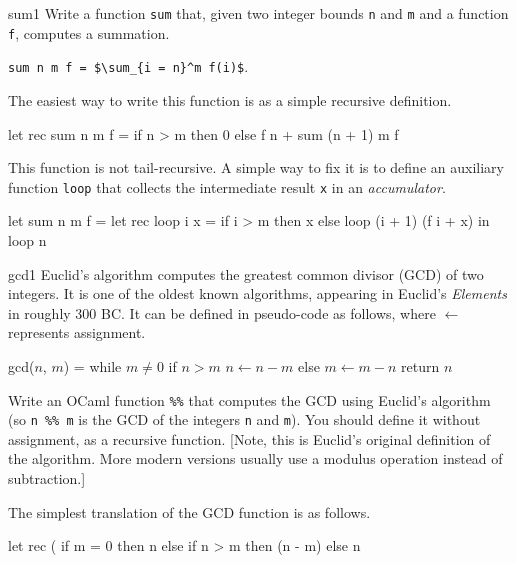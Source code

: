 %
\begin{exercise}{sum1}
Write a function \hbox{\lstinline/sum/} that, given two integer bounds \hbox{\lstinline/n/} and \hbox{\lstinline/m/} and
a function \hbox{\lstinline/f/}, computes a summation.

\begin{center}
\lstinline!sum n m f = $\sum_{i = n}^m f(i)$!.
\end{center}
%
\begin{answer}\ifanswers
The easiest way to write this function is as a simple recursive definition.

\begin{ocaml}
let rec sum n m f =
   if n > m then
      0
   else
      f n + sum (n + 1) m f
\end{ocaml}
%
This function is not tail-recursive.  A simple way to fix it is to define an auxiliary function
\hbox{\lstinline/loop/} that collects the intermediate result \hbox{\lstinline/x/} in an
\emph{accumulator}.

\begin{ocaml}
let sum n m f =
   let rec loop i x =
      if i > m then
         x
      else
         loop (i + 1) (f i + x)
   in
      loop n
\end{ocaml}
\fi\end{answer}
\end{exercise}

%
\begin{exercise}{gcd1}
Euclid's algorithm computes the greatest common divisor (GCD) of two integers.  It is one of the
oldest known algorithms, appearing in Euclid's \emph{Elements} in roughly 300 BC.  It can be defined in
pseudo-code as follows, where $\leftarrow$ represents assignment.

\begin{ocaml}
gcd($n$, $m$) =
   while $m \neq 0$
      if $n > m$
         $n \leftarrow n - m$
      else
         $m \leftarrow m - n$
   return $n$
\end{ocaml}
%
Write an OCaml function
%
\hbox{\lstinline/%%/}
%
that computes the GCD using Euclid's algorithm (so 
%
\hbox{\hbox{\lstinline/n %% m/}}
%
is the GCD of the integers \hbox{\lstinline/n/} and \hbox{\lstinline/m/}).  You should define it without
assignment, as a recursive function.  [Note, this is Euclid's original definition of the
  algorithm.  More modern versions usually use a modulus operation instead of subtraction.]

\begin{answer}\ifanswers
The simplest translation of the GCD function is as follows.

\begin{ocaml}
let rec (%
   if m = 0 then
      n
   else if n > m then
      (n - m) %
   else
      n %
\end{ocaml}
\fi\end{answer}
\end{exercise}

